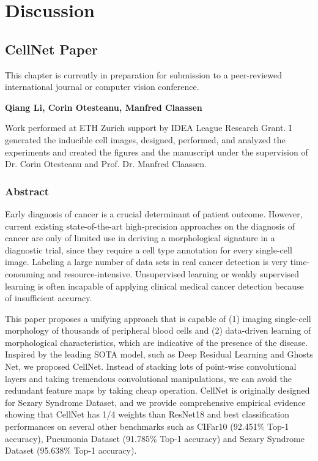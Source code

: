 \chapter{Discussion}
\label{sec:examples}

\section{CellNet Paper}
\label{sec:lorem}

This chapter is currently in preparation for submission to a peer-reviewed international journal or computer vision conference.

\textbf{Qiang Li, Corin Otesteanu, Manfred Claassen}

Work performed at ETH Zurich support by IDEA League Research Grant.
I generated the inducible cell images, designed, performed, and analyzed the experiments and created the figures and the manuscript under the supervision of Dr. Corin Otesteanu and Prof. Dr. Manfred Claassen.

\subsection{Abstract}
\label{sec:abstract}
Early diagnosis of cancer is a crucial determinant of patient outcome. However, current existing state-of-the-art high-precision approaches on the diagnosis of cancer are only of limited use in deriving a morphological signature in a diagnostic trial, since they require a cell type annotation for every single-cell image. Labeling a large number of data sets in real cancer detection is very time-consuming and resource-intensive. Unsupervised learning or weakly supervised learning is often incapable of applying clinical medical cancer detection because of insufficient accuracy.

This paper proposes a unifying approach that is capable of (1) imaging single-cell morphology of thousands of peripheral blood cells and (2) data-driven learning of morphological characteristics, which are indicative of the presence of the disease.
Inspired by the leading SOTA model, such as Deep Residual Learning\cite{20} and Ghosts Net\cite{19}, we proposed CellNet. Instead of stacking lots of point-wise convolutional layers and taking tremendous convolutional manipulations, we can avoid the redundant feature maps by taking cheap operation. CellNet is originally designed for Sezary Syndrome Dataset, and we provide comprehensive empirical evidence showing that CellNet has 1/4 weights than ResNet18 \cite{20} and best classification performances on several other benchmarks such as CIFar10 \cite{21} (92.451\% Top-1 accuracy), Pneumonia Dataset\cite{38} (91.785\% Top-1 accuracy) and Sezary Syndrome Dataset (95.638\% Top-1 accuracy).

